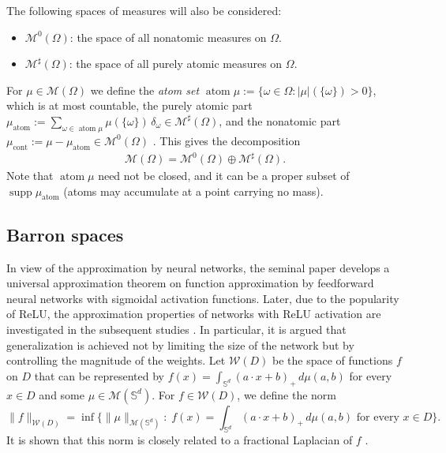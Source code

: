 \documentclass[11pt]{amsart}
\theoremstyle{definition}
\theoremstyle{remark}
\DeclareMathOperator{\atom}{atom}
\DeclareMathOperator{\cont}{cont}
\DeclareMathOperator{\supp}{supp}
\begin{document}
The following spaces of measures will also be considered:
\begin{itemize}
	\item $\mathcal{M}^0(\Omega)$: the space of all nonatomic measures on $\Omega$. 
	\item $\mathcal{M}^\sharp(\Omega)$: the space of all purely atomic measures on $\Omega$. 
\end{itemize}

For $\mu \in \mathcal{M}(\Omega)$ we define the \emph{atom set}
$\atom \mu := \{\omega \in \Omega : |\mu|(\{\omega\}) > 0\}$, which is at most
countable, the purely atomic part
$\mu_{\atom} := \sum_{\omega \in \atom\mu} \mu(\{\omega\})\, \delta_\omega \in \mathcal{M}^\sharp(\Omega)$,
and the nonatomic part $\mu_{\cont} := \mu - \mu_{\atom} \in \mathcal{M}^0(\Omega)$
\cite{bouchitte1990new}. This gives the decomposition
\begin{align*}
	\mathcal{M}(\Omega) = \mathcal{M}^0(\Omega) \oplus \mathcal{M}^\sharp(\Omega). 
\end{align*}
Note that $\atom \mu$ need not be closed, and it can be a proper subset of
$\supp \mu_{\atom}$ (atoms may accumulate at a point carrying no mass).

\subsection{Barron spaces}
In view of the approximation by neural networks, the seminal paper \cite{barron1993universal} develops a universal approximation theorem on function approximation by feedforward neural networks with sigmoidal activation functions.
Later, due to the popularity of ReLU, the approximation properties of networks with ReLU activation are investigated in the subsequent studies \cite{ongie2019function, savarese2019infinite, bengio2005convex, petrosyan2020neural}.
In particular, it is argued that generalization is achieved not by limiting the size of the network but by controlling the magnitude of the weights.
Let $\mathcal{W}(D)$ be the space of functions $f$ on $D$ that can be represented by $f(x) = \int_{\mathbb{S}^{d}} (a \cdot x + b)_+ \, d\mu(a, b)$ for every $x \in D$ and some $\mu \in \mathcal{M}(\mathbb{S}^d)$.
For $f \in \mathcal{W}(D)$, we define the norm
\begin{equation}
\label{W_norm}
	\|f\|_{\mathcal{W}(D)} = \inf \bigg\{ \|\mu\|_{\mathcal{M}(\mathbb{S}^d)} : \; f(x) = \int_{\mathbb{S}^{d}} (a \cdot x + b)_+ \, d\mu(a, b) \text{ for every } x \in D \bigg\}.
\end{equation}
It is shown that this norm is closely related to a fractional Laplacian of $f$ \cite{ongie2019function, savarese2019infinite}.
\end{document}
